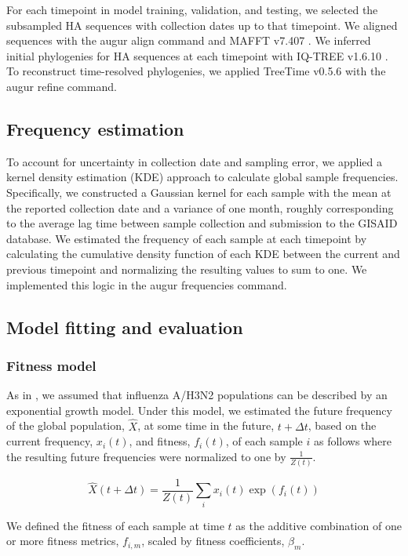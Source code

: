For each timepoint in model training, validation, and testing, we selected the subsampled HA sequences with collection dates up to that timepoint.
We aligned sequences with the augur align command \cite{Hadfield2018} and MAFFT v7.407 \cite{Katoh2002}.
We inferred initial phylogenies for HA sequences at each timepoint with IQ-TREE v1.6.10 \cite{Nguyen2014}.
To reconstruct time-resolved phylogenies, we applied TreeTime v0.5.6 \cite{Sagulenko2018} with the augur refine command.

\subsection*{Frequency estimation}

To account for uncertainty in collection date and sampling error, we applied a kernel density estimation (KDE) approach to calculate global sample frequencies.
Specifically, we constructed a Gaussian kernel for each sample with the mean at the reported collection date and a variance of one month, roughly corresponding to the average lag time between sample collection and submission to the GISAID database.
We estimated the frequency of each sample at each timepoint by calculating the cumulative density function of each KDE between the current and previous timepoint and normalizing the resulting values to sum to one.
We implemented this logic in the augur frequencies command.

\subsection*{Model fitting and evaluation}

\subsubsection*{Fitness model}

As in \cite{Luksza:2014hj}, we assumed that influenza A/H3N2 populations can be described by an exponential growth model.
Under this model, we estimated the future frequency of the global population, $\hat{X}$, at some time in the future, $t + \Delta{t}$, based on the current frequency, $x_{i}(t)$, and fitness, $f_{i}(t)$, of each sample $i$ as follows where the resulting future frequencies were normalized to one by $\frac{1}{Z(t)}$.

$$
\hat{X}(t + \Delta{t}) = \frac{1}{Z(t)}\sum_{i}x_{i}(t)\exp(f_{i}(t))
$$

We defined the fitness of each sample at time $t$ as the additive combination of one or more fitness metrics, $f_{i,m}$, scaled by fitness coefficients, $\beta_{m}$.

